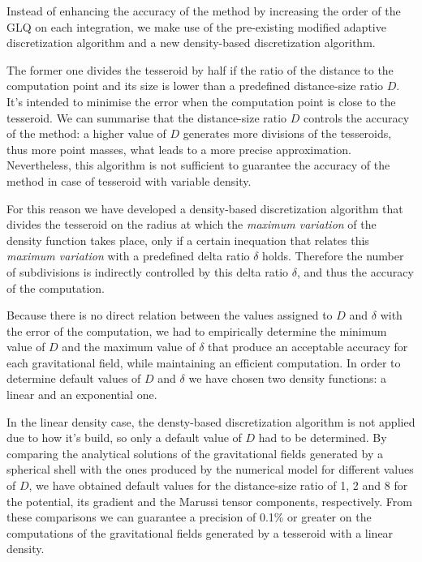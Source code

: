 \documentclass[extra]{gji}
\begin{document}

Instead of enhancing the accuracy of the method by increasing the order of the 
GLQ on each integration, we make use of the pre-existing modified adaptive 
discretization algorithm and a new density-based discretization algorithm.

The former one divides the tesseroid by half if the ratio of the distance to 
the computation point and its size is lower than a predefined distance-size 
ratio $D$.
It's intended to minimise the error when the computation point is close to the 
tesseroid.
We can summarise that the distance-size ratio $D$ controls the accuracy of the 
method: a higher value of $D$ generates more divisions of the tesseroids, thus 
more point masses, what leads to a more precise approximation.
Nevertheless, this algorithm is not sufficient to guarantee the accuracy of 
the method in case of tesseroid with variable density.

For this reason we have developed a density-based discretization algorithm that 
divides the tesseroid on the radius at which the \emph{maximum variation} of 
the density function takes place, only if a certain inequation that relates 
this \emph{maximum variation} with a predefined delta ratio $\delta$ holds.
Therefore the number of subdivisions is indirectly controlled by this delta 
ratio $\delta$, and thus the accuracy of the computation.

Because there is no direct relation between the values assigned to $D$ and 
$\delta$ with the error of the computation, we had to empirically determine 
the minimum value of $D$ and the maximum value of $\delta$ that produce an 
acceptable accuracy for each gravitational field, while maintaining an 
efficient computation.
In order to determine default values of $D$ and $\delta$ we have chosen two 
density functions: a linear and an exponential one.

In the linear density case, the densty-based discretization algorithm is not 
applied due to how it's build, so only a default value of $D$ had to be 
determined.
By comparing the analytical solutions of the gravitational fields generated by 
a spherical shell with the ones produced by the numerical model for different 
values of $D$, we have obtained default values for the distance-size ratio of 
1, 2 and 8 for the potential, its gradient and the Marussi tensor components, 
respectively.
From these comparisons we can guarantee a precision of 0.1\% or greater on the 
computations of the gravitational fields generated by a tesseroid with a 
linear density.
\end{document}
